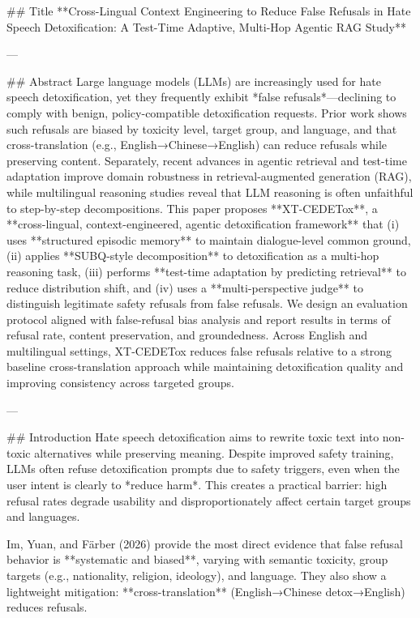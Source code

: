 ## Title  
**Cross-Lingual Context Engineering to Reduce False Refusals in Hate Speech Detoxification: A Test-Time Adaptive, Multi-Hop Agentic RAG Study**

---

## Abstract  
Large language models (LLMs) are increasingly used for hate speech detoxification, yet they frequently exhibit *false refusals*—declining to comply with benign, policy-compatible detoxification requests. Prior work shows such refusals are biased by toxicity level, target group, and language, and that cross-translation (e.g., English→Chinese→English) can reduce refusals while preserving content. Separately, recent advances in agentic retrieval and test-time adaptation improve domain robustness in retrieval-augmented generation (RAG), while multilingual reasoning studies reveal that LLM reasoning is often unfaithful to step-by-step decompositions. This paper proposes **XT-CEDETox**, a **cross-lingual, context-engineered, agentic detoxification framework** that (i) uses **structured episodic memory** to maintain dialogue-level common ground, (ii) applies **SUBQ-style decomposition** to detoxification as a multi-hop reasoning task, (iii) performs **test-time adaptation by predicting retrieval** to reduce distribution shift, and (iv) uses a **multi-perspective judge** to distinguish legitimate safety refusals from false refusals. We design an evaluation protocol aligned with false-refusal bias analysis and report results in terms of refusal rate, content preservation, and groundedness. Across English and multilingual settings, XT-CEDETox reduces false refusals relative to a strong baseline cross-translation approach while maintaining detoxification quality and improving consistency across targeted groups.

---

## Introduction  
Hate speech detoxification aims to rewrite toxic text into non-toxic alternatives while preserving meaning. Despite improved safety training, LLMs often refuse detoxification prompts due to safety triggers, even when the user intent is clearly to *reduce harm*. This creates a practical barrier: high refusal rates degrade usability and disproportionately affect certain target groups and languages.

Im, Yuan, and Färber (2026) provide the most direct evidence that false refusal behavior is **systematic and biased**, varying with semantic toxicity, group targets (e.g., nationality, religion, ideology), and language. They also show a lightweight mitigation: **cross-translation** (English→Chinese detox→English) reduces refusals.

